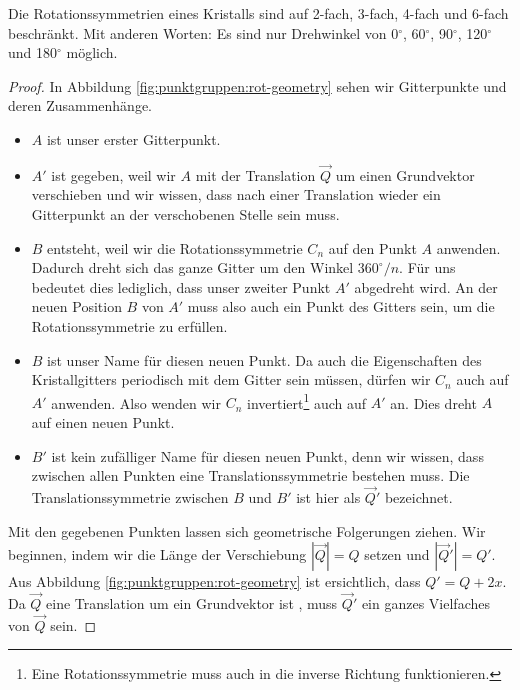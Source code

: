 \begin{satz}
   Die Rotationssymmetrien eines Kristalls sind auf 2-fach, 3-fach, 4-fach und 6-fach beschränkt.
   Mit anderen Worten: Es sind nur Drehwinkel von
    0\(^{\circ}\),
    60\(^{\circ}\),
    90\(^{\circ}\),
    120\(^{\circ}\) und
    180\(^{\circ}\)
   m\"oglich.
\end{satz}

\begin{proof}
 In Abbildung \ref{fig:punktgruppen:rot-geometry} sehen wir Gitterpunkte und deren Zusammenhänge.

 \begin{itemize}
     \item  \(A\) ist unser erster Gitterpunkt. 

     \item  \(A'\) ist gegeben, weil wir \(A\) mit der Translation \(\vec{Q}\) um einen Grundvektor verschieben und wir wissen, 
            dass nach einer Translation wieder ein Gitterpunkt an der verschobenen Stelle sein muss.
     \item \(B\) entsteht, weil wir die Rotationssymmetrie \(C_n\) auf den Punkt \(A\) anwenden.
         Dadurch dreht sich das ganze Gitter um den Winkel \(360^\circ/n\). 
         Für uns bedeutet dies lediglich, dass unser zweiter Punkt \(A'\) abgedreht wird.
         An der neuen Position \(B\) von \(A'\) muss also auch ein Punkt des Gitters sein, um die Rotationssymmetrie zu erfüllen.
     \item \(B\) ist unser Name für diesen neuen Punkt.
         Da auch die Eigenschaften des Kristallgitters periodisch mit dem Gitter sein müssen, dürfen wir \(C_n\) auch auf \(A'\) anwenden.
         Also wenden wir \(C_n\) invertiert\footnote{Eine Rotationssymmetrie muss auch in die inverse Richtung funktionieren.} 
         auch auf \(A'\) an. 
         Dies dreht \(A\) auf einen neuen Punkt.
     \item \(B'\) ist kein zufälliger Name für diesen neuen Punkt, denn wir wissen, dass zwischen allen Punkten eine Translationssymmetrie bestehen muss.
         Die  Translationssymmetrie zwischen \(B\) und \(B'\) ist hier als \(\vec{Q}'\) bezeichnet.
 \end{itemize}  
 Mit den gegebenen Punkten lassen sich geometrische Folgerungen ziehen.
 Wir beginnen, indem wir die Länge der Verschiebung \(|\vec{Q}| = Q\) setzen und \(|\vec{Q}'| = Q'\).
 Aus Abbildung \ref{fig:punktgruppen:rot-geometry} ist ersichtlich, dass \(Q' = Q + 2x\).
 Da \(\vec{Q}\) eine Translation um ein Grundvektor ist , muss \(\vec{Q}'\) ein ganzes Vielfaches von \(\vec{Q}\) sein.

\end{proof}

